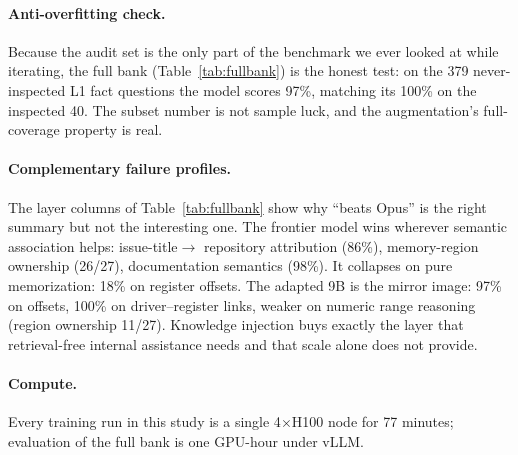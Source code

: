 \paragraph{Anti-overfitting check.} Because the audit set is the only part of
the benchmark we ever looked at while iterating, the full bank
(Table~\ref{tab:fullbank}) is the honest test: on the 379 never-inspected L1
fact questions the model scores 97\%, matching its 100\% on the inspected 40.
The subset number is not sample luck, and the augmentation's full-coverage
property is real.

\paragraph{Complementary failure profiles.} The layer columns of
Table~\ref{tab:fullbank} show why ``beats Opus'' is the right summary but not
the interesting one. The frontier
model wins wherever semantic association helps: issue-title$\rightarrow$
repository attribution (86\%), memory-region ownership (26/27), documentation
semantics (98\%). It collapses on pure memorization: 18\% on register offsets.
The adapted 9B is the mirror image: 97\% on offsets, 100\% on
driver--register links, weaker on numeric range reasoning (region ownership
11/27). Knowledge injection buys exactly the layer that retrieval-free
internal assistance needs and that scale alone does not provide.

\paragraph{Compute.} Every training run in this study is a single
4$\times$H100 node for 77 minutes; evaluation of the full bank is one
GPU-hour under vLLM.

